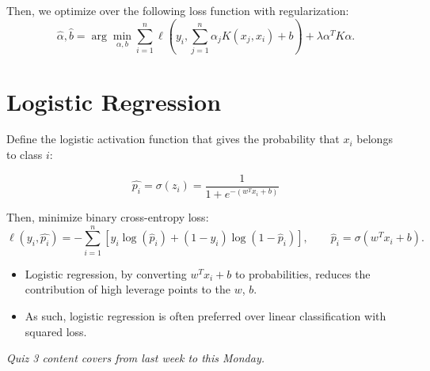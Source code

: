 \documentclass{article}
\begin{document}
Then, we optimize over the following loss function with regularization:
    \[
        \hat{\alpha}, \hat{b}
        =
        \arg\min_{\alpha,b}
        \sum_{i=1}^{n}
        \ell\left(
        y_i,
        \sum_{j=1}^{n}\alpha_j K(x_j,x_i)+b
        \right)
        +
        \lambda \alpha^T K \alpha.
    \]

\section{Logistic Regression}

Define the logistic activation function that gives the probability that $x_i$ belongs to class $i$:

\[
    \hat{p_i} = \sigma(z_i) = \frac{1}{1 + e^{-(w^Tx_i + b)}}
\]

Then, minimize binary cross-entropy loss:
\[
    \ell(y_i,\hat{p_i})
    =
    -\sum_{i=1}^n
    \left[
    y_i\log(\hat{p}_i)
    +
    (1-y_i)\log(1-\hat{p}_i)
    \right],
    \qquad
    \hat{p}_i = \sigma(w^T x_i+b).
\]

\begin{itemize}
    \item Logistic regression, by converting $w^Tx_i+b$ to probabilities, reduces the contribution of high leverage points to the $w$, $b$.
    \item As such, logistic regression is often preferred over linear classification with squared loss.
\end{itemize}

\textit{Quiz 3 content covers from last week to this Monday.}
\end{document}
